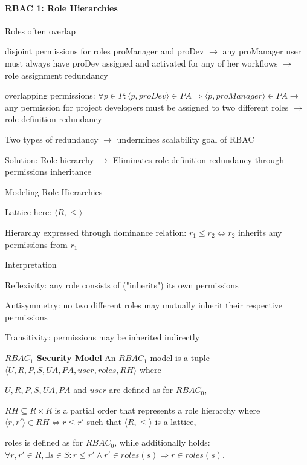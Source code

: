 \documentclass[a4paper]{article}
\renewcommand{\note}[2]{\begin{noteBox} \textbf{#1} #2 \end{noteBox}}
\begin{document}
\begin{multicols}{3}
    \paragraph{RBAC 1: Role Hierarchies}
    Roles often overlap
    \begin{enumerate*}
        \item disjoint permissions for roles proManager and proDev $\rightarrow$ any proManager user must always have proDev assigned and activated for any of her workflows $\rightarrow$ role assignment redundancy
        \item overlapping permissions: $\forall p\in P:\langle p,proDev\rangle \in PA\Rightarrow \langle p,proManager\rangle \in PA\rightarrow$ any permission for project developers must be assigned to two different roles $\rightarrow$ role definition redundancy
        \item Two types of redundancy $\rightarrow$ undermines scalability goal of RBAC
    \end{enumerate*}

    Solution: Role hierarchy $\rightarrow$ Eliminates role definition redundancy through permissions inheritance

    Modeling Role Hierarchies
    \begin{itemize*}
        \item Lattice here: $\langle R,\leq\rangle$
        \item Hierarchy expressed through dominance relation: $r_1\leq r_2 \Leftrightarrow r_2$ inherits any permissions from $r_1$
        \item Interpretation
        \begin{itemize*}
            \item Reflexivity: any role consists of ("inherits") its own permissions
            \item Antisymmetry: no two different roles may mutually inherit their respective permissions
            \item Transitivity: permissions may be inherited indirectly
        \end{itemize*}
    \end{itemize*}

    \note{$RBAC_1$ Security Model}{An $RBAC_1$ model is a tuple $\langle U,R,P,S,UA,PA,user,roles,RH\rangle$ where
        \begin{itemize*}
            \item $U,R,P,S,UA,PA$ and $user$ are defined as for $RBAC_0$,
            \item $RH\subseteq R\times R$ is a partial order that represents a role hierarchy where $\langle r,r'\rangle \in RH\Leftrightarrow r\leq r'$ such that $\langle R,\leq\rangle$ is a lattice,
            \item roles is defined as for $RBAC_0$, while additionally holds: $\forall r,r'\in R,\exists s\in S:r\leq r'\wedge r'\in roles(s)\Rightarrow r\in roles(s)$.
        \end{itemize*}
    }


\end{multicols}
\end{document}
